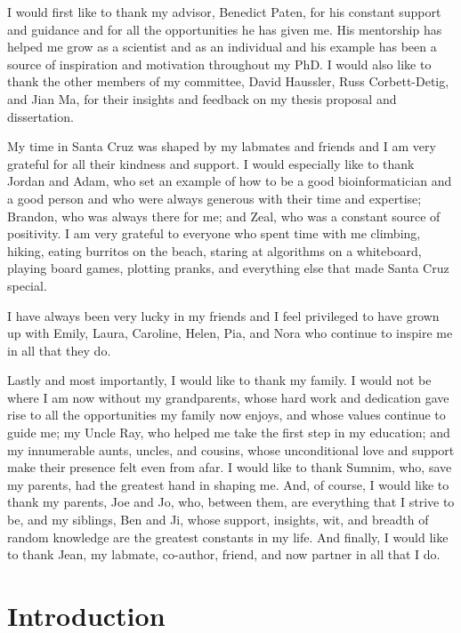 \documentclass[11pt]{ucscthesis}
\begin{document}
\begin{frontmatter}
\begin{acknowledgements}
I would first like to thank my advisor, Benedict Paten, for his constant support and guidance and for all the opportunities he has given me.
His mentorship has helped me grow as a scientist and as an individual and his example has been a source of inspiration and motivation throughout my PhD.
I would also like to thank the other members of my committee, David Haussler, Russ Corbett-Detig, and Jian Ma, for their insights and feedback on my thesis proposal and dissertation.

My time in Santa Cruz was shaped by my labmates and friends and I am very grateful for all their kindness and support.
I would especially like to thank Jordan and Adam, who set an example of how to be a good bioinformatician and a good person and who were always generous with their time and expertise; Brandon, who was always there for me; and Zeal, who was a constant source of positivity. 
I am very grateful to everyone who spent time with me climbing, hiking, eating burritos on the beach, staring at algorithms on a whiteboard, playing board games, plotting pranks, and everything else that made Santa Cruz special.

I have always been very lucky in my friends and I feel privileged to have grown up with Emily, Laura, Caroline, Helen, Pia, and Nora who continue to inspire me in all that they do.

Lastly and most importantly, I would like to thank my family.
I would not be where I am now without my grandparents, whose hard work and dedication gave rise to all the opportunities my family now enjoys, and whose values continue to guide me; my Uncle Ray, who helped me take the first step in my education; and my innumerable aunts, uncles, and cousins, whose unconditional love and support make their presence felt even from afar.
I would like to thank Sumnim, who, save my parents, had the greatest hand in shaping me.
And, of course, I would like to thank my parents, Joe and Jo, who, between them, are everything that I strive to be, and my siblings, Ben and Ji, whose support, insights, wit, and breadth of random knowledge are the greatest constants in my life.
And finally, I would like to thank Jean, my labmate, co-author, friend, and now partner in all that I do.

\end{acknowledgements}

\end{frontmatter}


\chapter{Introduction}
\end{document}
